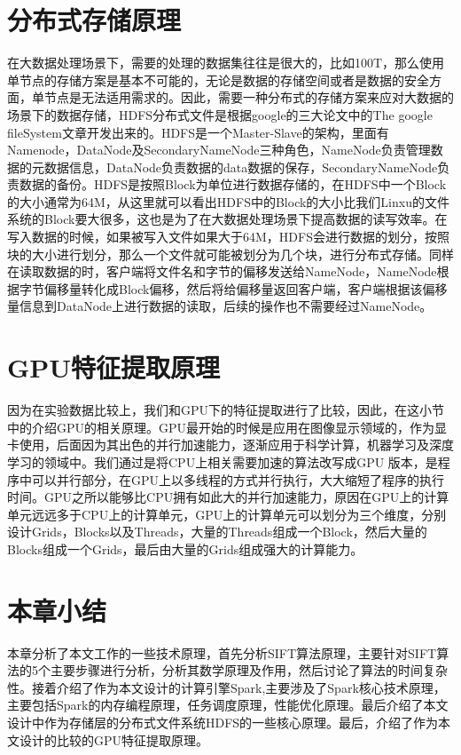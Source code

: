 \section{分布式存储原理}
在大数据处理场景下，需要的处理的数据集往往是很大的，比如100T，那么使用单节点的存储方案是基本不可能的，无论是数据的存储空间或者是数据的安全方面，单节点是无法适用需求的。因此，需要一种分布式的存储方案来应对大数据的场景下的数据存储，HDFS分布式文件是根据google的三大论文中的The google fileSystem文章开发出来的。HDFS是一个Master-Slave的架构，里面有Namenode，DataNode及SecondaryNameNode三种角色，NameNode负责管理数据的元数据信息，DataNode负责数据的data数据的保存，SecondaryNameNode负责数据的备份。HDFS是按照Block为单位进行数据存储的，在HDFS中一个Block的大小通常为64M，从这里就可以看出HDFS中的Block的大小比我们Linxu的文件系统的Block要大很多，这也是为了在大数据处理场景下提高数据的读写效率。在写入数据的时候，如果被写入文件如果大于64M，HDFS会进行数据的划分，按照块的大小进行划分，那么一个文件就可能被划分为几个块，进行分布式存储。同样在读取数据的时，客户端将文件名和字节的偏移发送给NameNode，NameNode根据字节偏移量转化成Block偏移，然后将给偏移量返回客户端，客户端根据该偏移量信息到DataNode上进行数据的读取，后续的操作也不需要经过NameNode。
\section{GPU特征提取原理}
因为在实验数据比较上，我们和GPU下的特征提取进行了比较，因此，在这小节中的介绍GPU的相关原理。GPU最开始的时候是应用在图像显示领域的，作为显卡使用，后面因为其出色的并行加速能力，逐渐应用于科学计算，机器学习及深度学习的领域中。我们通过是将CPU上相关需要加速的算法改写成GPU 版本，是程序中可以并行部分，在GPU上以多线程的方式并行执行，大大缩短了程序的执行时间。GPU之所以能够比CPU拥有如此大的并行加速能力，原因在GPU上的计算单元远远多于CPU上的计算单元，GPU上的计算单元可以划分为三个维度，分别设计Grids，Blocks以及Threads，大量的Threads组成一个Block，然后大量的Blocks组成一个Grids，最后由大量的Grids组成强大的计算能力。
\section{本章小结}
本章分析了本文工作的一些技术原理，首先分析SIFT算法原理，主要针对SIFT算法的5个主要步骤进行分析，分析其数学原理及作用，然后讨论了算法的时间复杂性。接着介绍了作为本文设计的计算引擎Spark,主要涉及了Spark核心技术原理，主要包括Spark的内存编程原理，任务调度原理，性能优化原理。最后介绍了本文设计中作为存储层的分布式文件系统HDFS的一些核心原理。最后，介绍了作为本文设计的比较的GPU特征提取原理。



